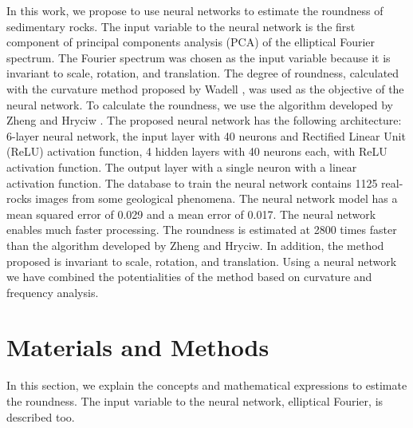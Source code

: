 \documentclass[conference]{IEEEtran}
\begin{document}
In this work, we propose to use neural networks to estimate the roundness of sedimentary rocks. The input variable to the neural network is the first component of principal components analysis (PCA) of the elliptical Fourier spectrum. The Fourier spectrum was chosen as the input variable because it is invariant to scale, rotation, and translation. The degree of roundness, calculated with the curvature method proposed by Wadell \cite{b6}, was used as the objective of the neural network. To calculate the roundness, we use the algorithm developed by Zheng and Hryciw \cite{b7}. The proposed neural network has the following architecture: 6-layer neural network, the input layer with 40 neurons and Rectified Linear Unit (ReLU) activation function, 4 hidden layers with 40 neurons each, with ReLU activation function. The output layer with a single neuron with a linear activation function. The database to train the neural network contains 1125 real-rocks images from some geological phenomena. The neural network model has a mean squared error of 0.029 and a mean error of 0.017. The neural network enables much faster processing. The roundness is estimated at 2800 times faster than the algorithm developed by Zheng and Hryciw. In addition, the method proposed is invariant to scale, rotation, and translation. Using a neural network we have combined the potentialities of the method based on curvature and frequency analysis.


\section{Materials and Methods}
In this section, we explain the concepts and mathematical expressions to estimate the roundness. The input variable to the neural network, elliptical Fourier, is described too.
\end{document}
